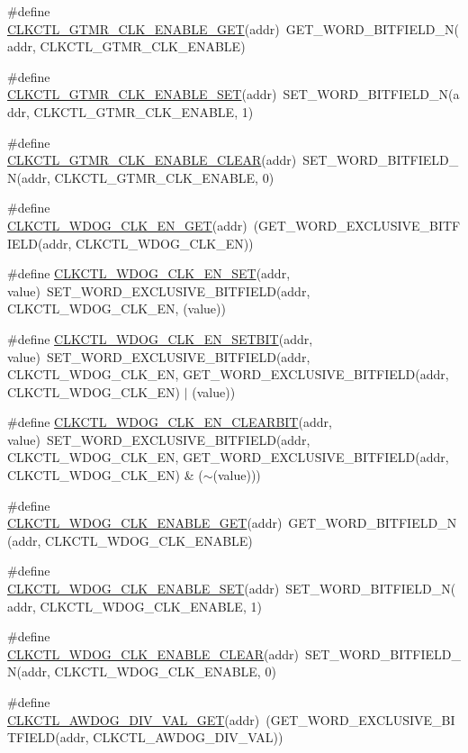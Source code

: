 \begin{DoxyCompactItemize}
\item 
\#define \hyperlink{a00544_a2f416147eecfda27870f756f6c059c46}{CLKCTL\_\-GTMR\_\-CLK\_\-ENABLE\_\-GET}(addr)~GET\_\-WORD\_\-BITFIELD\_\-N(addr, CLKCTL\_\-GTMR\_\-CLK\_\-ENABLE)
\item 
\#define \hyperlink{a00544_af03440abd0951f71b21317fac336317b}{CLKCTL\_\-GTMR\_\-CLK\_\-ENABLE\_\-SET}(addr)~SET\_\-WORD\_\-BITFIELD\_\-N(addr, CLKCTL\_\-GTMR\_\-CLK\_\-ENABLE, 1)
\item 
\#define \hyperlink{a00544_a70ed5683765f17cf23c64811c7c6bbbc}{CLKCTL\_\-GTMR\_\-CLK\_\-ENABLE\_\-CLEAR}(addr)~SET\_\-WORD\_\-BITFIELD\_\-N(addr, CLKCTL\_\-GTMR\_\-CLK\_\-ENABLE, 0)
\item 
\#define \hyperlink{a00544_a1fbb92b06caf6e2ba854b8e33561355d}{CLKCTL\_\-WDOG\_\-CLK\_\-EN\_\-GET}(addr)~(GET\_\-WORD\_\-EXCLUSIVE\_\-BITFIELD(addr, CLKCTL\_\-WDOG\_\-CLK\_\-EN))
\item 
\#define \hyperlink{a00544_aeb992ff720e0eee65f59ccda74df7fea}{CLKCTL\_\-WDOG\_\-CLK\_\-EN\_\-SET}(addr, value)~SET\_\-WORD\_\-EXCLUSIVE\_\-BITFIELD(addr, CLKCTL\_\-WDOG\_\-CLK\_\-EN, (value))
\item 
\#define \hyperlink{a00544_a7b3e0faa00b946bf956ec9388204790a}{CLKCTL\_\-WDOG\_\-CLK\_\-EN\_\-SETBIT}(addr, value)~SET\_\-WORD\_\-EXCLUSIVE\_\-BITFIELD(addr, CLKCTL\_\-WDOG\_\-CLK\_\-EN, GET\_\-WORD\_\-EXCLUSIVE\_\-BITFIELD(addr, CLKCTL\_\-WDOG\_\-CLK\_\-EN) $|$ (value))
\item 
\#define \hyperlink{a00544_a4eb48340bf6f724c4fd964946bc56b1c}{CLKCTL\_\-WDOG\_\-CLK\_\-EN\_\-CLEARBIT}(addr, value)~SET\_\-WORD\_\-EXCLUSIVE\_\-BITFIELD(addr, CLKCTL\_\-WDOG\_\-CLK\_\-EN, GET\_\-WORD\_\-EXCLUSIVE\_\-BITFIELD(addr, CLKCTL\_\-WDOG\_\-CLK\_\-EN) \& ($\sim$(value)))
\item 
\#define \hyperlink{a00544_af6ed56463b2032a644333a26d484cbc0}{CLKCTL\_\-WDOG\_\-CLK\_\-ENABLE\_\-GET}(addr)~GET\_\-WORD\_\-BITFIELD\_\-N(addr, CLKCTL\_\-WDOG\_\-CLK\_\-ENABLE)
\item 
\#define \hyperlink{a00544_a9715a659fc74e5eca7ba7f4114e67e14}{CLKCTL\_\-WDOG\_\-CLK\_\-ENABLE\_\-SET}(addr)~SET\_\-WORD\_\-BITFIELD\_\-N(addr, CLKCTL\_\-WDOG\_\-CLK\_\-ENABLE, 1)
\item 
\#define \hyperlink{a00544_a7cd106934685b7490204bee69b708a30}{CLKCTL\_\-WDOG\_\-CLK\_\-ENABLE\_\-CLEAR}(addr)~SET\_\-WORD\_\-BITFIELD\_\-N(addr, CLKCTL\_\-WDOG\_\-CLK\_\-ENABLE, 0)
\item 
\#define \hyperlink{a00544_a728fde49a48d390b95e3a5ff697e0d46}{CLKCTL\_\-AWDOG\_\-DIV\_\-VAL\_\-GET}(addr)~(GET\_\-WORD\_\-EXCLUSIVE\_\-BITFIELD(addr, CLKCTL\_\-AWDOG\_\-DIV\_\-VAL))

\end{DoxyCompactItemize}
